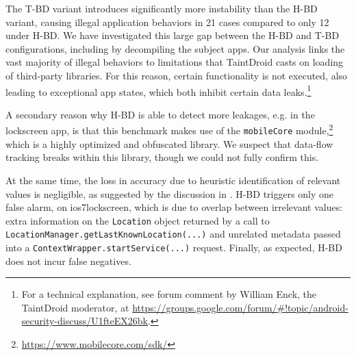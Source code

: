 
The T-BD variant introduces significantly more instability than the H-BD variant, causing illegal application behaviors in 21 cases compared to only 12 under H-BD. We have investigated this large gap between the H-BD and T-BD configurations, including by decompiling the subject apps. Our analysis links the vast majority of illegal behaviors to limitations that
TaintDroid casts on loading of third-party libraries. For this reason, certain functionality is not executed, also leading to exceptional app states, which both inhibit certain data leaks.\footnote{
	For a technical explanation, see forum comment by William Enck, the TaintDroid moderator, at \href{https://groups.google.com/forum/\#!topic/android-security-discuss/U1fteEX26bk}{https://groups.google.com/forum/\#!topic/android-security-discuss/U1fteEX26bk}.
}

A secondary reason why H-BD is able to detect more leakages, e.g. in the lockscreen app, is that this benchmark makes use of the {\tt mobileCore} module,\footnote{
\href{https://www.mobilecore.com/sdk/}{https://www.mobilecore.com/sdk/}
} which is a highly optimized and obfuscated library. We suspect that data-flow tracking breaks within this library, though we could not fully confirm this.

At the same time, the loss in accuracy due to heuristic identification of relevant values is negligible, as suggested by the discussion in . H-BD triggers only one false alarm, on  ios7lockscreen,
which is due to overlap between irrelevant values: extra information on the {\tt Location} object returned by a call to {\tt LocationManager.getLastKnownLocation(...)} and unrelated metadata passed into a {\tt ContextWrapper.startService(...)} request.  Finally, as expected, H-BD does not incur false negatives.